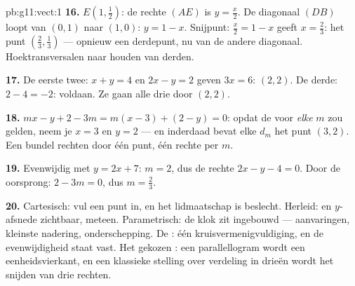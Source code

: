 \begin{solution}{pb:g11:vect:1}
\textbf{16.} $E\left(1, \frac12\right)$: de rechte $(AE)$ is
$y = \frac x2$. De diagonaal $(DB)$ loopt van $(0,1)$ naar $(1,0)$:
$y = 1 - x$. Snijpunt: $\frac x2 = 1 - x$ geeft $x = \frac23$: het punt
$\left(\frac23, \frac13\right)$ --- opnieuw een derdepunt, nu van de andere
diagonaal. Hoektransversalen naar  houden van derden.

\textbf{17.} De eerste twee: $x + y = 4$ en $2x - y = 2$ geven $3x = 6$:
$(2, 2)$. De derde: $2 - 4 = -2$: voldaan. Ze gaan alle drie door $(2, 2)$.

\textbf{18.} $mx - y + 2 - 3m = m(x - 3) + (2 - y) = 0$: opdat de
 voor \emph{elke} $m$ zou gelden, neem je $x = 3$ en $y = 2$ ---
en inderdaad bevat elke $d_m$ het punt $(3, 2)$. Een bundel rechten door één
punt, één rechte per  $m$.

\textbf{19.} Evenwijdig met $y = 2x + 7$:  $m = 2$, dus
de rechte $2x - y - 4 = 0$. Door de oorsprong: $2 - 3m = 0$, dus
$m = \frac23$.

\textbf{20.} Cartesisch: vul een punt in, en het lidmaatschap is beslecht.
Herleid:  en $y$-afsnede zichtbaar,  meteen.
Parametrisch: de klok zit ingebouwd --- aanvaringen, kleinste nadering,
onderschepping. De : één kruisvermenigvuldiging, en de
evenwijdigheid staat vast. Het gekozen : een parallellogram wordt
een eenheidsvierkant, en een klassieke stelling over verdeling in drieën
wordt het snijden van drie rechten.
\end{solution}
